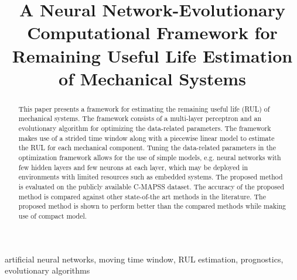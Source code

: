 


\begin{frontmatter}

\title{A Neural Network-Evolutionary Computational Framework for Remaining Useful Life Estimation of Mechanical Systems}

\begin{comment}
\author{David Laredo$^{1}$, Zhaoyin Chen$^{1}$, Oliver Sch\"utze$^{2}$ and Jian-Qiao Sun$^{1}$}
\address{
$^{1}$Department of Mechanical Engineering\\
School of Engineering, University of California\\
Merced, CA 95343, USA\\
$^{2}$Department of Computer Science, CINVESTAV\\ 
Mexico City, Mexico\\
Corresponding author. Email: jqsun@ucmerced.edu}
\end{comment}

\begin{abstract}
This paper presents a framework for estimating the remaining useful life (RUL) of mechanical systems. The framework consists of a multi-layer perceptron and an evolutionary algorithm for optimizing the data-related parameters. The framework makes use of a strided time window along with a piecewise linear model to estimate the RUL for each mechanical component. Tuning the data-related parameters in the optimization framework allows for the use of simple models, e.g. neural networks with few hidden layers and few neurons at each layer, which may be deployed in environments with limited resources such as embedded systems. The proposed method is evaluated on the publicly available C-MAPSS dataset. The accuracy of the proposed method is compared against other state-of-the art methods in the literature. The proposed method is shown to perform better than the compared methods while making use of compact model.

\end{abstract}


\begin{keyword}
artificial neural networks\sep
moving time window\sep
RUL estimation\sep
prognostics\sep
evolutionary algorithms
\end{keyword}

\end{frontmatter}
